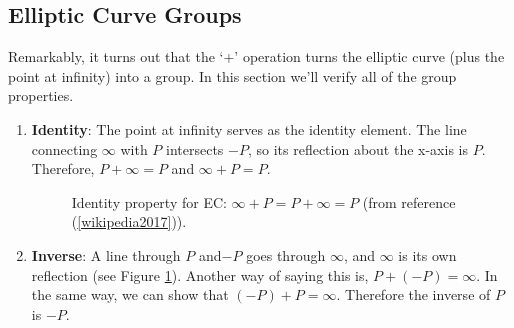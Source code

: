 \subsection{Elliptic Curve Groups}
Remarkably, it turns out that the `+' operation turns the elliptic curve (plus the point at infinity)  into a group.  In this section we'll verify all of the group properties. 

\begin{enumerate}[1.]
\item \textbf{Identity}: The point at infinity serves as the identity element.  The line connecting $\infty$ with $P$ intersects $-P$, so its reflection about the x-axis is $P$. Therefore, $P + \infty = P$ and $\infty + P = P$. 
\begin{figure}[H]
	  \caption{\label{fig:DH:DHKE_13} Identity property for EC: $\infty + P = P + \infty = P$ (from reference (\ref{wikipedia2017})).}
\end{figure}
\item \textbf{Inverse}: A line through $P$ and$-P$ goes through $\infty$, and $\infty$ is its own reflection (see Figure \ref{fig:DH:DHKE_13}). Another way of saying this is, $P + (- P) = \infty$. In the same way, we can show that $(-P) + P = \infty$. Therefore the inverse of $P$ is $-P$. 


\end{enumerate}
